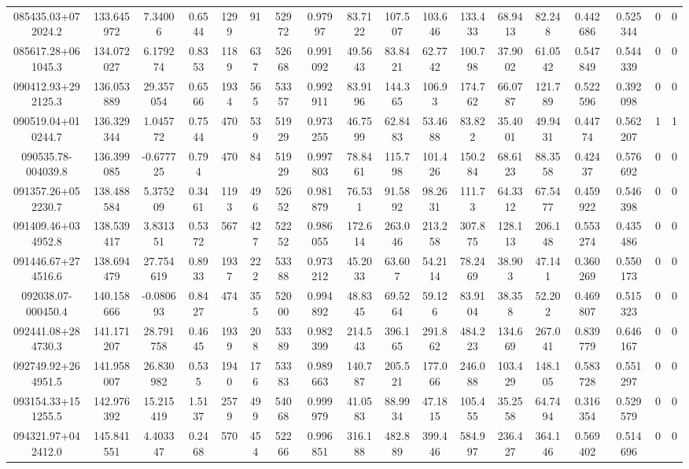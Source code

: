 \begin{table}
\begin{tabular}{cccccccccccccccccc}
085435.03+072024.2 & 133.645972 & 7.34006 & 0.6544 & 1299 & 91 & 52972 & 0.97997 & 83.7122 & 107.507 & 103.646 & 133.433 & 68.9413 & 82.248 & 0.442686 & 0.525344 & 0 & 0 \\
085617.28+061045.3 & 134.072027 & 6.179274 & 0.8353 & 1189 & 637 & 52668 & 0.991092 & 49.5643 & 83.8421 & 62.7742 & 100.798 & 37.9002 & 61.0542 & 0.547849 & 0.544339 & 0 & 0 \\
090412.93+292125.3 & 136.053889 & 29.357054 & 0.6566 & 1934 & 565 & 53357 & 0.992911 & 83.9196 & 144.365 & 106.93 & 174.762 & 66.0787 & 121.789 & 0.522596 & 0.392098 & 0 & 0 \\
090519.04+010244.7 & 136.329344 & 1.045772 & 0.7544 & 470 & 539 & 51929 & 0.973255 & 46.7599 & 62.8483 & 53.4688 & 83.822 & 35.4001 & 49.9431 & 0.44774 & 0.562207 & 1 & 1 \\
090535.78-004039.8 & 136.399085 & -0.677725 & 0.794 & 470 & 84 & 51929 & 0.997803 & 78.8461 & 115.798 & 101.426 & 150.284 & 68.6123 & 88.3558 & 0.42437 & 0.576692 & 0 & 0 \\
091357.26+052230.7 & 138.488584 & 5.375209 & 0.3461 & 1193 & 496 & 52652 & 0.981879 & 76.531 & 91.5892 & 98.2631 & 111.73 & 64.3312 & 67.5477 & 0.459922 & 0.546398 & 0 & 0 \\
091409.46+034952.8 & 138.539417 & 3.831351 & 0.5372 & 567 & 427 & 52252 & 0.986055 & 172.614 & 263.046 & 213.258 & 307.875 & 128.113 & 206.148 & 0.553274 & 0.435486 & 0 & 0 \\
091446.67+274516.6 & 138.694479 & 27.754619 & 0.8933 & 1937 & 222 & 53388 & 0.973212 & 45.2033 & 63.607 & 54.2114 & 78.2469 & 38.903 & 47.141 & 0.360269 & 0.550173 & 0 & 0 \\
092038.07-000450.4 & 140.158666 & -0.080693 & 0.8427 & 474 & 355 & 52000 & 0.994892 & 48.8345 & 69.5264 & 59.126 & 83.9104 & 38.358 & 52.202 & 0.469807 & 0.515323 & 0 & 0 \\
092441.08+284730.3 & 141.171207 & 28.791758 & 0.4645 & 1939 & 208 & 53389 & 0.982399 & 214.543 & 396.165 & 291.862 & 484.223 & 134.669 & 267.041 & 0.839779 & 0.646167 & 0 & 0 \\
092749.92+264951.5 & 141.958007 & 26.830982 & 0.535 & 1940 & 176 & 53383 & 0.989663 & 140.787 & 205.521 & 177.066 & 246.088 & 103.429 & 148.105 & 0.583728 & 0.551297 & 0 & 0 \\
093154.33+151255.5 & 142.976392 & 15.215419 & 1.5137 & 2579 & 499 & 54068 & 0.999979 & 41.0583 & 88.9934 & 47.1815 & 105.455 & 35.2558 & 64.7494 & 0.316354 & 0.529579 & 0 & 0 \\
094321.97+042412.0 & 145.841551 & 4.403347 & 0.2468 & 570 & 454 & 52266 & 0.996851 & 316.188 & 482.889 & 399.446 & 584.997 & 236.427 & 364.146 & 0.569402 & 0.514696 & 0 & 0 \\

\end{tabular}
\end{table}

